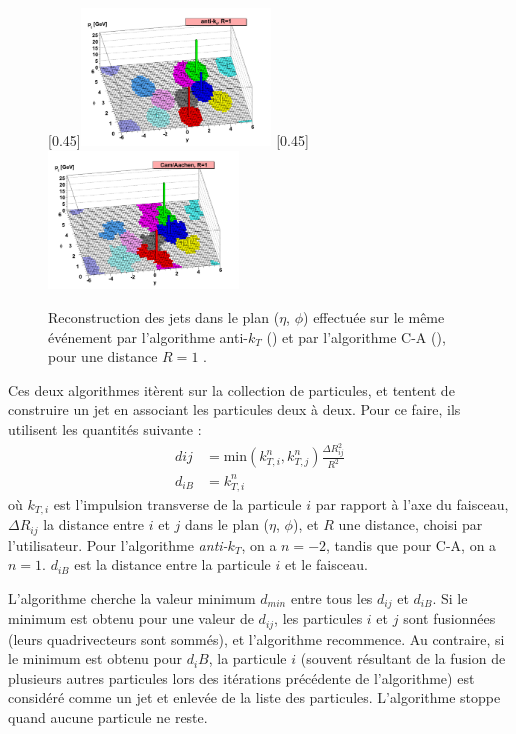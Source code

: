 \medskip

\begin{figure}[tbp]
    \centering
    \subcaptionbox{\label{fig:jets_akt}}[0.45\textwidth]{\includegraphics[width=0.45\textwidth]{chapitre3/figs/jets_akt.png}} \hfill
    \subcaptionbox{\label{fig:jets_ca}}[0.45\textwidth]{\includegraphics[width=0.45\textwidth]{chapitre3/figs/jets_ca.png}}
    \caption{Reconstruction des jets dans le plan ($\eta$, $\phi$) effectuée sur le même événement par l'algorithme anti-$k_T$ () et par l'algorithme C-A (), pour une distance $R = 1$ \citep{antikt}.}
    \label{fig:akt_ca}
\end{figure}

Ces deux algorithmes itèrent sur la collection de particules, et tentent de construire un jet en associant les particules deux à deux. Pour ce faire, ils utilisent les quantités suivante :
\begin{align*}
  d{ij} &= \text{min}\left( k_{T, i}^n, k_{T, j}^n \right) \frac{\Delta R^2_{ij}}{R^2} \\
  d_{iB} &= k^n_{T, i}
\end{align*}
où $k_{T, i}$ est l'impulsion transverse de la particule $i$ par rapport à l'axe du faisceau, $\Delta R_{ij}$ la distance entre $i$ et $j$ dans le plan ($\eta$, $\phi$), et $R$ une distance, choisi par l'utilisateur. Pour l'algorithme \emph{anti-$k_T$}, on a $n = -2$, tandis que pour C-A, on a $n = 1$. $d_{iB}$ est la distance entre la particule $i$ et le faisceau.

L'algorithme cherche la valeur minimum $d_{min}$ entre tous les $d_{ij}$ et $d_{iB}$. Si le minimum est obtenu pour une valeur de $d_{ij}$, les particules $i$ et $j$ sont fusionnées (leurs quadrivecteurs sont sommés), et l'algorithme recommence. Au contraire, si le minimum est obtenu pour $d_iB$, la particule $i$ (souvent résultant de la fusion de plusieurs autres particules lors des itérations précédente de l'algorithme) est considéré comme un jet et enlevée de la liste des particules. L'algorithme stoppe quand aucune particule ne reste.

